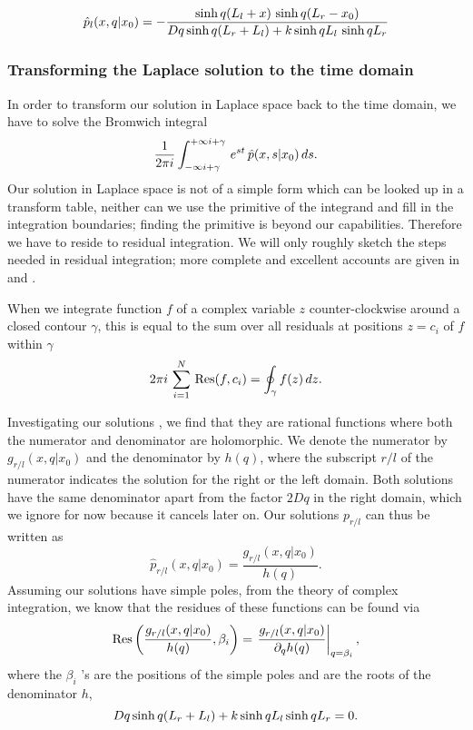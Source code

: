 \begin{equation}
 \hat{p}_l(x,q|x_0) = -\frac{\mathrm{sinh} \, q(L_l + x) \,\, \mathrm{sinh} \, q(L_r - x_0)}{Dq \, \mathrm{sinh} \, q(L_r + L_l) + k \, \mathrm{sinh} \, q L_l \,\, \mathrm{sinh} \, q L_r}
\elabel{SOL_L}
\end{equation}

\subsubsection{Transforming the Laplace solution to the time domain}

In order to transform our solution in Laplace space back to the time domain, we have to solve the Bromwich integral
\begin{equation}
 \frac{1}{2 \pi i} \int_{-\infty i + \gamma}^{+\infty i + \gamma} \, e^{s t} \, \hat{p}(x,s|x_0) \, ds.
 \elabel{INT_I}
\end{equation}
Our solution in Laplace space is not of a simple form which can be looked up in a transform table, neither can we use the primitive of the integrand and fill in the integration boundaries; finding the primitive is beyond our capabilities. Therefore we have to reside to residual integration. We will only roughly sketch the steps needed in residual integration; more complete and excellent accounts are given in \cite{Carslaw1959} and \cite{Bossen2011a}.

When we integrate function $f$ of a complex variable $z$ counter-clockwise around a closed contour $\gamma$, this is equal to the sum over all residuals at positions $z = c_i$ of $f$ within $\gamma$
\begin{equation}
 2 \pi i\,\sum_{i=1}^{N}\,\mathrm{Res}(f,c_i) = \oint_\gamma f(z)\,dz.
 \elabel{RES_I}
\end{equation}

Investigating our solutions , we find that they are rational functions where both the numerator and denominator are holomorphic. We denote the numerator by $g_{r/l}(x,q|x_0)$ and the denominator by $h(q)$, where the subscript $r/l$ of the numerator indicates the solution for the right or the left domain. Both solutions have the same denominator apart from the factor $2 D q$ in the right domain, which we ignore for now because it cancels later on. Our solutions $p_{r/l}$ can thus be written as
\begin{equation} 
 \hat{p}_{r/l}(x,q|x_0) = \frac{g_{r/l}(x,q|x_0)}{h(q)}.
\end{equation}
Assuming our solutions have simple poles, from the theory of complex integration, we know that the residues of these functions can be found via
\begin{equation} 
 \mathrm{Res} \left( \frac{g_{r/l}(x,q|x_0)}{h(q)},\beta_i \right) = \left. \frac{g_{r/l}(x,q|x_0)}{\partial_q h(q)} \right|_{q = \beta_i},
 \elabel{RES_II}
\end{equation}
where the $\beta_i$ 's are the positions of the simple poles and are the roots of the denominator $h$,
\begin{equation} 
 Dq \, \mathrm{sinh} \, q (L_r + L_l) + k \, \mathrm{sinh} \, q L_l \, \mathrm{sinh} \, q L_r = 0.
 \elabel{ROOT_I}
\end{equation}

